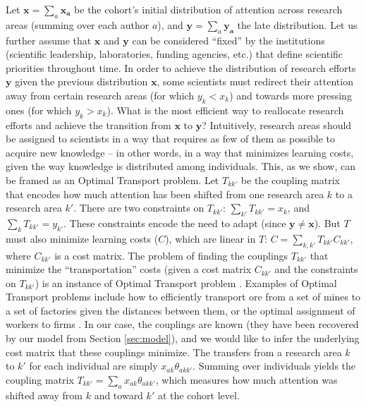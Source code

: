 \documentclass{article}
\begin{document}
Let $\bm{x}=\sum_a \bm{x_a}$ be the cohort's initial distribution of attention across research areas (summing over each author $a$), and $\bm{y}=\sum_a \bm{y_a}$ the late distribution. Let us further assume that $\bm{x}$ and $\bm{y}$ can be considered ``fixed'' by the institutions (scientific leadership, laboratories, funding agencies, etc.) that define scientific priorities throughout time. In order to achieve the distribution of research efforts $\bm{y}$ given the previous distribution $\bm{x}$, some scientists must redirect their attention away from certain research areas (for which $y_k<x_k$) and towards more pressing ones (for which $y_k>x_k$). What is the most efficient way to reallocate research efforts and achieve the transition from $\bm{x}$ to $\bm{y}$? Intuitively, research areas should be assigned to scientists in a way that requires as few of them as possible to acquire new knowledge -- in other words, in a way that minimizes learning costs, given the way knowledge is distributed among individuals. This, as we show, can be framed as an Optimal Transport problem. Let $T_{kk'}$ be the coupling matrix that encodes how much attention has been shifted from one research area $k$ to a research area $k'$. There are two constraints on $T_{kk'}$: $\sum_{k'} T_{kk'} = x_k$, and $\sum_{k} T_{kk'} = y_{k'}$. These constraints encode the need to adapt (since $\bm{y}\neq \bm{x}$). But $T$ must also minimize learning costs ($C$), which are linear in $T$: $C=\sum_{k,k'}T_{kk'}C_{kk'}$, where $C_{kk'}$ is a cost matrix. The problem of finding the couplings $T_{kk'}$ that minimize the ``transportation'' costs (given a cost matrix $C_{kk'}$ and the constraints on $T_{kk'}$) is an instance of Optimal Transport problem \citep{Peyr2019}. Examples of Optimal Transport problems include how to efficiently transport ore from a set of mines to a set of factories given the distances between them, or the optimal assignment of workers to firms \citep{galichon2018optimal}. In our case, the couplings are known (they have been recovered by our model from Section \ref{sec:model}), and we would like to infer the underlying cost matrix that these couplings minimize. The transfers from a research area $k$ to $k'$ for each individual are simply $x_{ak}\theta_{akk'}$. Summing over individuals yields the coupling matrix $T_{kk'}=\sum_a x_{ak} \theta_{akk'}$, which measures how much attention was shifted away from $k$ and toward $k'$ at the cohort level.
\end{document}
